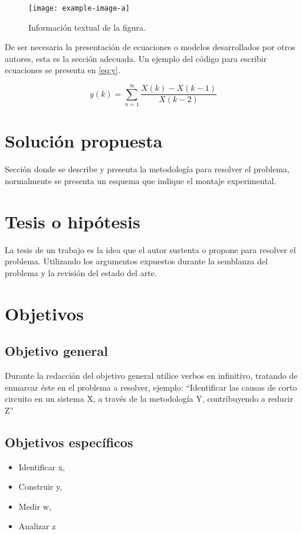 \documentclass[twocolumns]{IEEEtran}
\begin{document}
\begin{figure}[t!]
   \centering
   \texttt{[image: example-image-a]}
   \caption{Información textual de la figura.}\label{ref:FiguraA}
\end{figure}

De ser necesaria la presentación de ecuaciones o modelos desarrollados por
otros autores, esta es la sección adecuada. Un ejemplo del código para escribir
ecuaciones se presenta en \eqref{eq:y}.

\begin{equation}
   y(k)=\sum_{n=1}^{\infty}\frac{X(k)-X(k-1)}{X(k-2)}\label{eq:y}
\end{equation}

\section{Solución propuesta}
Sección donde se describe y presenta la metodología para resolver el problema,
normalmente se presenta un esquema que indique el montaje experimental.

\section{Tesis o hipótesis}
La tesis de un trabajo es la idea que el autor sustenta o propone para resolver
el problema. Utilizando los argumentos expuestos  durante la semblanza del
problema y la revisión del estado del arte.


\section{Objetivos}
\subsection{Objetivo general}
Durante la redacción del objetivo general utilice verbos en infinitivo,
tratando de enmarcar éste en el problema a resolver, ejemplo: ``Identificar las
causas de corto circuito en un sistema X, 
a través de  la metodología Y, contribuyendo  a reducir Z''

\subsection{Objetivos específicos}
\begin{itemize}
   \item  Identificar  x, 
   \item Construir y,
   \item Medir w, 
   \item Analizar  z
\end{itemize}
\end{document}
